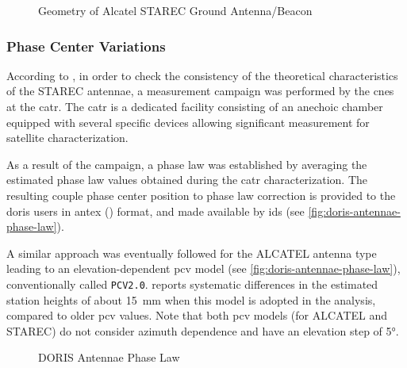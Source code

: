 \begin{figure}
  \centering
  
  \caption{Geometry of Alcatel STAREC Ground Antenna/Beacon}
  \label{fig:starec-antenna}
\end{figure}

\subsubsection{Phase Center Variations}\label{sssec:doris-pcv}
According to \cite{Tourain2016}, in order to check the consistency of the theoretical 
characteristics of the STAREC antennae, a measurement campaign was performed by 
the \gls{cnes} at the \gls{catr}. The \gls{catr} is a dedicated facility 
consisting of an anechoic chamber equipped with several specific devices 
allowing significant measurement for satellite characterization.

As a result of the campaign, a phase law was established by averaging the 
estimated phase law values obtained during the \gls{catr} characterization. 
The resulting couple phase center position to phase law correction is provided 
to the \gls{doris} users in \gls{antex} (\cite{ANTEXv14}) format, and 
made available by \gls{ids} (see \autoref{fig:doris-antennae-phase-law}).

A similar approach was eventually followed for the ALCATEL antenna type 
leading to an elevation-dependent \gls{pcv} model (see \autoref{fig:doris-antennae-phase-law}), 
conventionally called \texttt{PCV2.0}. \cite{Stepanek2022} reports systematic differences in 
the estimated station heights of about \SI{15}{\milli\meter} when this model is 
adopted in the analysis, compared to older \gls{pcv} values. Note that both 
\gls{pcv} models (for ALCATEL and STAREC) do not consider azimuth dependence 
and have an elevation step of \ang{5}.

\begin{figure}
  \centering
  
  \caption{DORIS Antennae Phase Law}
  \label{fig:doris-antennae-phase-law}
\end{figure}
